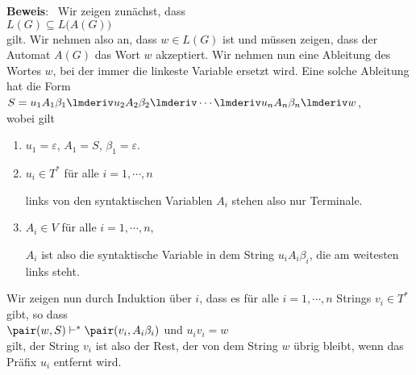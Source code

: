\noindent
\textbf{Beweis}:  \ Wir zeigen zun\"achst, dass
\\[0.2cm]
\hspace*{1.3cm}
$L(G) \subseteq L\bigl(A(G)\bigr)$
\\[0.2cm]
gilt.  Wir nehmen also an, dass $w \in L(G)$ ist und m\"ussen zeigen, dass der Automat $A(G)$
das Wort $w$ akzeptiert.  Wir nehmen nun eine Ableitung des Wortes $w$, bei der immer die 
linkeste Variable ersetzt wird.  Eine solche Ableitung hat die Form
\\[0.2cm]
\hspace*{1.3cm}
$S = u_1A_1\beta_1 \lmderiv u_2A_2\beta_2 \lmderiv \cdots \lmderiv u_nA_n\beta_n \lmderiv w$,
\\[0.2cm]
wobei gilt
\begin{enumerate}
\item $u_1 = \varepsilon$, $A_1 = S$, $\beta_1 = \varepsilon$.
\item $u_i \in T^*$ \quad f\"ur alle $i=1,\cdots,n$

      links von den syntaktischen Variablen $A_i$ stehen also nur Terminale.
\item $A_i \in V$ \quad f\"ur alle $i=1,\cdots,n$,

      $A_i$ ist also die syntaktische Variable in dem String $u_iA_i\beta_i$, die am
      weitesten links steht. 
\end{enumerate}
Wir zeigen nun durch Induktion \"uber $i$, dass es f\"ur alle $i=1,\cdots,n$  Strings $v_i \in T^*$ 
gibt, so dass 
\\[0.2cm]
\hspace*{1.3cm}
$\pair(w,S) \vdash^* \pair(v_i, A_i\beta_i)$ und $u_iv_i = w$
\\[0.2cm]
gilt, der String $v_i$ ist also der Rest, der von dem String $w$ \"ubrig bleibt, wenn das Pr\"afix
$u_i$ entfernt wird.
